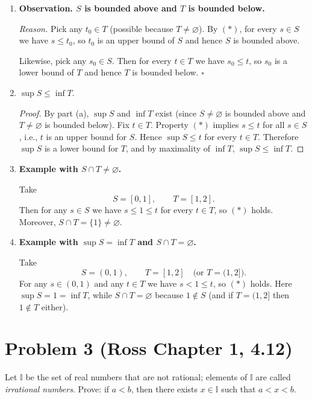\documentclass[12pt]{article}
\begin{document}
\begin{enumerate}[label=\textbf{(\alph*)}]

\item \textbf{Observation. $S$ is bounded above and $T$ is bounded below.}

\emph{Reason.}
Pick any $t_0\in T$ (possible because $T\neq\varnothing$).  By $(\ast)$, for every
$s\in S$ we have $s\le t_0$, so $t_0$ is an upper bound of $S$ and hence $S$
is bounded above.

Likewise, pick any $s_0\in S$.  Then for every $t\in T$ we have $s_0\le t$, so
$s_0$ is a lower bound of $T$ and hence $T$ is bounded below. \hfill $\square$

\item \textbf{} $\displaystyle \sup S \le \inf T$.

\begin{proof}
By part (a), $\sup S$ and $\inf T$ exist (since $S\neq\varnothing$ is bounded
above and $T\neq\varnothing$ is bounded below).
Fix $t\in T$.  Property $(\ast)$ implies $s\le t$ for all $s\in S$, i.e., $t$ is an
upper bound for $S$.  Hence $\sup S\le t$ for every $t\in T$.
Therefore $\sup S$ is a lower bound for $T$, and by maximality of $\inf T$,
\(\sup S \le \inf T\).
\end{proof}

\item \textbf{Example with $S\cap T\neq\varnothing$.}

Take
\[
S=[0,1], \qquad T=[1,2].
\]
Then for any $s\in S$ we have $s\le 1\le t$ for every $t\in T$, so $(\ast)$ holds.
Moreover, $S\cap T=\{1\}\neq\varnothing$.

\item \textbf{Example with $\sup S=\inf T$ and $S\cap T=\varnothing$.}

Take
\[
S=(0,1), \qquad T=[1,2] \quad\text{(or }T=(1,2]\text{)}.
\]
For any $s\in(0,1)$ and any $t\in T$ we have $s<1\le t$, so $(\ast)$ holds.
Here $\sup S=1=\inf T$, while $S\cap T=\varnothing$ because $1\notin S$ (and if
$T=(1,2]$ then $1\notin T$ either).
\end{enumerate}

\section*{Problem 3 (Ross Chapter 1, 4.12)}
Let $\mathbb{I}$ be the set of real numbers that are not rational; elements of $\mathbb{I}$ are called \emph{irrational numbers}.  
Prove: if $a<b$, then there exists $x\in\mathbb{I}$ such that $a<x<b$.
\end{document}

